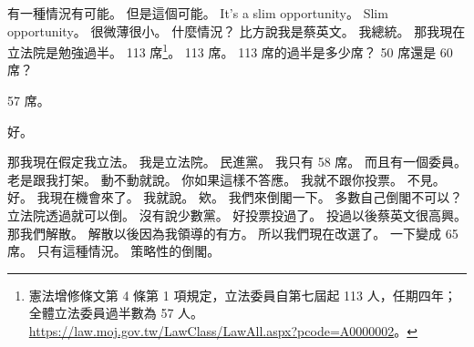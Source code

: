 \hypertarget{w01:cue:2548}{}有一種情況有可能。
\hypertarget{w01:cue:2549}{}但是這個可能。
\hypertarget{w01:cue:2550}{}It's a slim opportunity。
\hypertarget{w01:cue:2551}{}Slim opportunity。
\hypertarget{w01:cue:2552}{}很微薄很小。
\hypertarget{w01:cue:2553}{}什麼情況？
\hypertarget{w01:cue:2554}{}比方說我是蔡英文。
\hypertarget{w01:cue:2555}{}我總統。
\hypertarget{w01:cue:2556}{}那我現在立法院是勉強過半。
\hypertarget{w01:cue:2557}{}113 席\footnote{憲法增修條文第 4 條第 1 項規定，立法委員自第七屆起 113 人，任期四年；全體立法委員過半數為 57 人。\url{https://law.moj.gov.tw/LawClass/LawAll.aspx?pcode=A0000002}。}。
\hypertarget{w01:cue:2558}{}113 席。
\hypertarget{w01:cue:2559}{}113 席的過半是多少席？
\hypertarget{w01:cue:2560}{}50 席還是 60 席？

\hypertarget{w01:cue:2561}{}57 席。

\hypertarget{w01:cue:2562}{}好。

\hypertarget{w01:cue:2563}{}那我現在假定我立法。
\hypertarget{w01:cue:2564}{}我是立法院。
\hypertarget{w01:cue:2565}{}民進黨。
\hypertarget{w01:cue:2566}{}我只有 58 席。
\hypertarget{w01:cue:2567}{}而且有一個委員。
\hypertarget{w01:cue:2568}{}老是跟我打架。
\hypertarget{w01:cue:2569}{}動不動就說。
\hypertarget{w01:cue:2570}{}你如果這樣不答應。
\hypertarget{w01:cue:2571}{}我就不跟你投票。
\hypertarget{w01:cue:2572}{}不見。
\hypertarget{w01:cue:2573}{}好。
\hypertarget{w01:cue:2574}{}我現在機會來了。
\hypertarget{w01:cue:2575}{}我就說。
\hypertarget{w01:cue:2576}{}欸。
\hypertarget{w01:cue:2577}{}我們來倒閣一下。
\hypertarget{w01:cue:2578}{}多數自己倒閣不可以？
\hypertarget{w01:cue:2579}{}立法院透過就可以倒。
\hypertarget{w01:cue:2580}{}沒有說少數黨。
\hypertarget{w01:cue:2581}{}好投票投過了。
\hypertarget{w01:cue:2582}{}投過以後蔡英文很高興。
\hypertarget{w01:cue:2583}{}那我們解散。
\hypertarget{w01:cue:2584}{}解散以後因為我領導的有方。
\hypertarget{w01:cue:2585}{}所以我們現在改選了。
\hypertarget{w01:cue:2586}{}一下變成 65 席。
\hypertarget{w01:cue:2587}{}只有這種情況。
\hypertarget{w01:cue:2588}{}策略性的倒閣。

